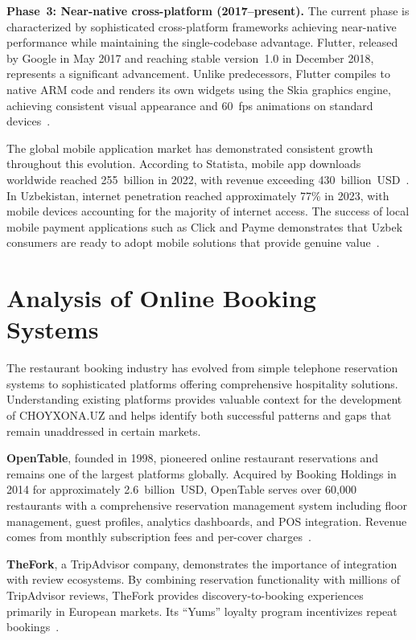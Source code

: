 \textbf{Phase~3: Near-native cross-platform (2017--present).}
The current phase is characterized by sophisticated cross-platform frameworks achieving near-native performance while maintaining the single-codebase advantage.
Flutter, released by Google in May 2017 and reaching stable version~1.0 in December 2018, represents a significant advancement.
Unlike predecessors, Flutter compiles to native ARM code and renders its own widgets using the Skia graphics engine, achieving consistent visual appearance and 60~fps animations on standard devices~\cite{flutter_arch2024}.

The global mobile application market has demonstrated consistent growth throughout this evolution.
According to Statista, mobile app downloads worldwide reached 255~billion in 2022, with revenue exceeding 430~billion~USD~\cite{statista2024}.
In Uzbekistan, internet penetration reached approximately 77\% in 2023, with mobile devices accounting for the majority of internet access.
The success of local mobile payment applications such as Click and Payme demonstrates that Uzbek consumers are ready to adopt mobile solutions that provide genuine value~\cite{gartner2023}.


\section{Analysis of Online Booking Systems}
\label{sec:booking-analysis}

The restaurant booking industry has evolved from simple telephone reservation systems to sophisticated platforms offering comprehensive hospitality solutions.
Understanding existing platforms provides valuable context for the development of CHOYXONA.UZ and helps identify both successful patterns and gaps that remain unaddressed in certain markets.

\textbf{OpenTable}, founded in 1998, pioneered online restaurant reservations and remains one of the largest platforms globally.
Acquired by Booking Holdings in 2014 for approximately 2.6~billion~USD, OpenTable serves over 60,000 restaurants with a comprehensive reservation management system including floor management, guest profiles, analytics dashboards, and POS integration.
Revenue comes from monthly subscription fees and per-cover charges~\cite{opentable2023}.

\textbf{TheFork}, a TripAdvisor company, demonstrates the importance of integration with review ecosystems.
By combining reservation functionality with millions of TripAdvisor reviews, TheFork provides discovery-to-booking experiences primarily in European markets.
Its \enquote{Yums} loyalty program incentivizes repeat bookings~\cite{gartner2023}.

